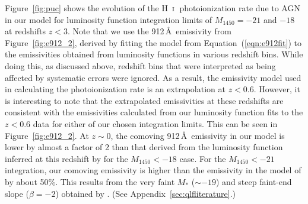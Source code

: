 \documentclass[fleqn,usenatbib]{mnras}
\def\HI{\hbox{H~$\scriptstyle\rm I$}}
\begin{document}
Figure~\ref{fig:puc} shows the evolution of the \HI\ photoionization
rate due to AGN in our model for luminosity function integration
limits of $M_{1450}=-21$ and $-18$ at redshifts $z<3$.  Note that we
use the 912\,\AA\ emissivity from Figure~\ref{fig:e912_2}, derived by
fitting the model from Equation~(\ref{eqn:e912fit}) to the
emissivities obtained from luminosity functions in various redshift
bins.  While doing this, as discussed above, redshift bins that were
interpreted as being affected by systematic errors were ignored.  As a
result, the emissivity model used in calculating the photoionization
rate is an extrapolation at $z<0.6$.  However, it is interesting to
note that the extrapolated emissivities at these redshifts are
consistent with the emissivities calculated from our luminosity
function fits to the $z<0.6$ data for either of our chosen integration
limits.  This can be seen in Figure~\ref{fig:e912_2}.  At $z\sim 0$,
the comoving 912\,\AA\ emissivity in our model is lower by almost a
factor of 2 than that derived from the luminosity function inferred at
this redshift by \citet{2009A&A...507..781S} for the $M_{1450}<-18$
case.  For the $M_{1450}<-21$ integration, our comoving emissivity is
higher than the emissivity in the model of \citet{2009A&A...507..781S}
by about 50\%.  This results from the very faint $M_*$ ($\sim -19$)
and steep faint-end slope ($\beta=-2$) obtained by
\citet{2009A&A...507..781S}.  (See Appendix~\ref{sec:qlfliterature}.)
\end{document}
